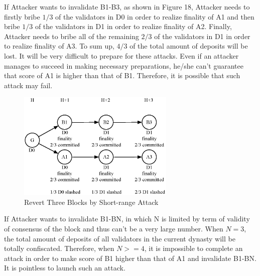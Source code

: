 If Attacker wants to invalidate B1-B3, as shown in Figure 18, Attacker needs to firstly bribe $1/3$ of the validators in D0 in order to realize finality of A1 and then bribe $1/3$ of the validators in D1 in order to realize finality of A2. Finally, Attacker needs to bribe all of the remaining $2/3$ of the validators in D1 in order to realize finality of A3. To sum up, $4/3$ of the total amount of deposits will be lost. It will be very difficult to prepare for these attacks. Even if an attacker manages to succeed in making necessary preparations, he/she can’t guarantee that score of A1 is higher than that of B1. Therefore, it is possible that such attack may fail.


\begin{figure}[h]
\centering
\includegraphics[width=7.5cm]{./figs/revert3}
\caption{Revert Three Blocks by Short-range Attack}
\label{fig:revert3}
\end{figure}

If Attacker wants to invalidate B1-BN, in which N is limited by term of validity of consensus of the block and thus can't be a very large number. When $N = 3$, the total amount of deposits of all validators in the current dynasty will be totally confiscated. Therefore, when $N >= 4$, it is impossible to complete an attack in order to make score of B1 higher than that of A1 and invalidate B1-BN. It is pointless to launch such an attack.

